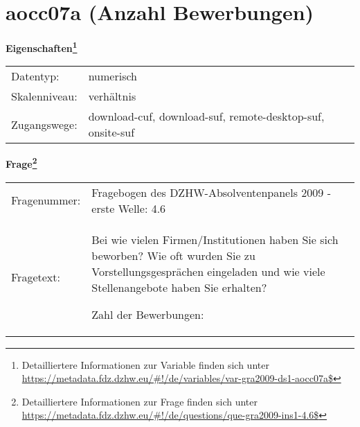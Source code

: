 
    \setcounter{footnote}{0}

    \vspace*{-1.8cm}
	\section{aocc07a (Anzahl Bewerbungen)}
	\label{section:aocc07a}



    \vspace*{0.5cm}
    \noindent\textbf{Eigenschaften\footnote{Detailliertere Informationen zur Variable finden sich unter
		\url{https://metadata.fdz.dzhw.eu/\#!/de/variables/var-gra2009-ds1-aocc07a$}}}\\
	\begin{tabularx}{\hsize}{@{}lX}
	Datentyp: & numerisch \\
	Skalenniveau: & verhältnis \\
	Zugangswege: &
	  download-cuf, 
	  download-suf, 
	  remote-desktop-suf, 
	  onsite-suf
 \\
    \end{tabularx}



				\vspace*{0.5cm}
                \noindent\textbf{Frage\footnote{Detailliertere Informationen zur Frage finden sich unter
		              \url{https://metadata.fdz.dzhw.eu/\#!/de/questions/que-gra2009-ins1-4.6$}}}\\
				\begin{tabularx}{\hsize}{@{}lX}
					Fragenummer: &
					  Fragebogen des DZHW-Absolventenpanels 2009 - erste Welle:
					  4.6
 \\
					Fragetext: & Bei wie vielen Firmen/Institutionen haben Sie sich beworben? Wie oft wurden Sie zu Vorstellungsgesprächen eingeladen und wie viele Stellenangebote haben Sie erhalten?\par  Zahl der Bewerbungen: \\
				\end{tabularx}





